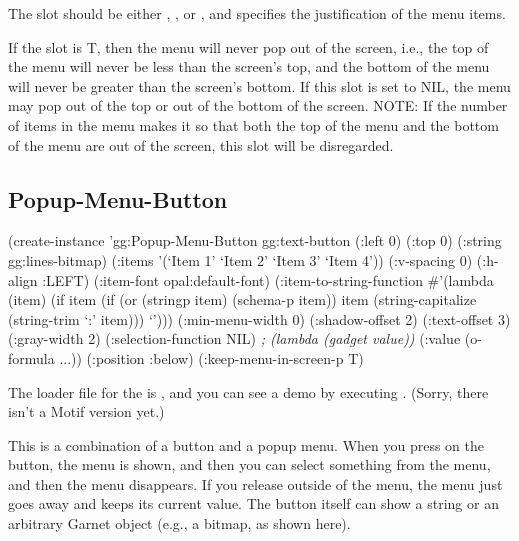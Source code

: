 The  slot should be either , , or
, and specifies the justification of the menu items.

If the  slot is T, then the menu will never pop
out of the screen, i.e., the top of the menu will never be less than
the screen's top, and the bottom of the menu will never be greater
than the screen's bottom.  If this slot is set to NIL, the menu may
pop out of the top or out of the bottom of the screen.
NOTE: If the number of items in the menu makes it so that both the top
of the menu and the bottom of the menu are out of the screen, this
slot will be disregarded.



\begin{group}
\section{Popup-Menu-Button}
\label{popup-menu-button}
\begin{center}
\end{center}

\begin{programexample}
(create-instance 'gg:Popup-Menu-Button gg:text-button
  (:left 0)
  (:top 0)
  (:string gg:lines-bitmap)
  (:items '(`Item 1' `Item 2' `Item 3' `Item 4'))
  (:v-spacing 0)
  (:h-align :LEFT)
  (:item-font opal:default-font)
  (:item-to-string-function
   \#'(lambda (item)
       (if item
	   (if (or (stringp item) (schema-p item))
	       item
	       (string-capitalize (string-trim `:' item)))
	   `')))
  (:min-menu-width 0)
  (:shadow-offset 2)
  (:text-offset 3)
  (:gray-width 2)
  (:selection-function NIL)   {\it ; (lambda (gadget value))}
  (:value (o-formula ...))
  (:position :below)
  (:keep-menu-in-screen-p T)
\end{programexample}
\end{group}

The loader file for the  is
, and you can see a demo by executing
.  (Sorry, there isn't a Motif version
yet.)

This is a combination of a button and a popup menu.  When you press on
the button, the menu is shown, and then you can select something from
the menu, and then the menu disappears.  If you release outside of the
menu, the menu just goes away and keeps its current value.  The button
itself can show a string or an arbitrary Garnet object (e.g., a
bitmap, as shown here).

